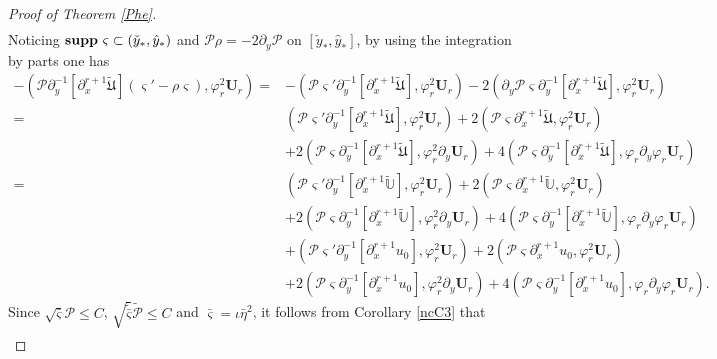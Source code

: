 \documentclass[10pt,a4paper]{amsart}
\begin{document}
\begin{proof}[Proof of Theorem \ref{Phe}]
\begin{align*}
\end{align*}
Noticing ${\bf supp}~\varsigma \subset(\check{y}_{*},\hat{y}_{*})$ and $\mathcal{P}\rho=-2\partial_{y}\mathcal{P}$ on $[\check{y}_{*},\hat{y}_{*}]$, by using the integration by parts one has
\begin{align}\label{J72}
-(\mathcal{P}\partial_{y}^{-1}[\partial_{x}^{r+1}\tilde{\mathfrak{U}}](\varsigma'-\rho\varsigma),\varphi_{r}^{2}\mathbf{U}_{r})
=&-(\mathcal{P}\varsigma'\partial_{y}^{-1}[\partial_{x}^{r+1}\tilde{\mathfrak{U}}],\varphi_{r}^{2}\mathbf{U}_{r})
  -2(\partial_{y}\mathcal{P}\varsigma\partial_{y}^{-1}[\partial_{x}^{r+1}\tilde{\mathfrak{U}}],\varphi_{r}^{2}\mathbf{U}_{r})\\
=& (\mathcal{P}\varsigma'\partial_{y}^{-1}[\partial_{x}^{r+1}\tilde{\mathfrak{U}}],\varphi_{r}^{2}\mathbf{U}_{r})
  +2(\mathcal{P}\varsigma\partial_{x}^{r+1}\tilde{\mathfrak{U}},\varphi_{r}^{2}\mathbf{U}_{r})\nonumber\\
 &+2(\mathcal{P}\varsigma\partial_{y}^{-1}[\partial_{x}^{r+1}\tilde{\mathfrak{U}}],\varphi_{r}^{2}\partial_{y}\mathbf{U}_{r})
  +4(\mathcal{P}\varsigma\partial_{y}^{-1}[\partial_{x}^{r+1}\tilde{\mathfrak{U}}],\varphi_{r}\partial_{y}\varphi_{r}\mathbf{U}_{r})\nonumber\\
=& (\mathcal{P}\varsigma'\partial_{y}^{-1}[\partial_{x}^{r+1}\tilde{\mathbb{U}}],\varphi_{r}^{2}\mathbf{U}_{r})
  +2(\mathcal{P}\varsigma\partial_{x}^{r+1}\tilde{\mathbb{U}},\varphi_{r}^{2}\mathbf{U}_{r})\nonumber\\
 &+2(\mathcal{P}\varsigma\partial_{y}^{-1}[\partial_{x}^{r+1}\tilde{\mathbb{U}}],\varphi_{r}^{2}\partial_{y}\mathbf{U}_{r})
  +4(\mathcal{P}\varsigma\partial_{y}^{-1}[\partial_{x}^{r+1}\tilde{\mathbb{U}}],\varphi_{r}\partial_{y}\varphi_{r}\mathbf{U}_{r})\nonumber\\
 &+(\mathcal{P}\varsigma'\partial_{y}^{-1}[\partial_{x}^{r+1}u_{0}],\varphi_{r}^{2}\mathbf{U}_{r})
  +2(\mathcal{P}\varsigma\partial_{x}^{r+1}u_{0},\varphi_{r}^{2}\mathbf{U}_{r})\nonumber\\
 &+2(\mathcal{P}\varsigma\partial_{y}^{-1}[\partial_{x}^{r+1}u_{0}],\varphi_{r}^{2}\partial_{y}\mathbf{U}_{r})
  +4(\mathcal{P}\varsigma\partial_{y}^{-1}[\partial_{x}^{r+1}u_{0}],\varphi_{r}\partial_{y}\varphi_{r}\mathbf{U}_{r})\nonumber.
\end{align}
Since $\sqrt{\bar{\varsigma}}\mathcal{P}\leq C$, $\sqrt{\tilde{\bar{\varsigma}}}\tilde{\mathcal{P}}\leq C$ and $\bar{\varsigma}=\iota\bar{\eta}^{2}$, it follows from Corollary \ref{ncC3} that
\begin{align}\label{J721}

\end{align}
\end{proof}
\end{document}
